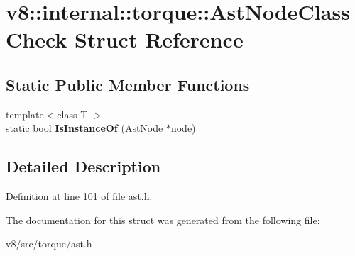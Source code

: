 \hypertarget{structv8_1_1internal_1_1torque_1_1AstNodeClassCheck}{}\section{v8\+:\+:internal\+:\+:torque\+:\+:Ast\+Node\+Class\+Check Struct Reference}
\label{structv8_1_1internal_1_1torque_1_1AstNodeClassCheck}
\subsection*{Static Public Member Functions}
\begin{DoxyCompactItemize}
\item 
\mbox{\label{structv8_1_1internal_1_1torque_1_1AstNodeClassCheck_ad8f597c5018d0b0e1db8a564d66c8731}} 
{\footnotesize template$<$class T $>$ }\\static \mbox{\hyperlink{classbool}{bool}} {\bfseries Is\+Instance\+Of} (\mbox{\hyperlink{structv8_1_1internal_1_1torque_1_1AstNode}{Ast\+Node}} $\ast$node)
\end{DoxyCompactItemize}


\subsection{Detailed Description}


Definition at line 101 of file ast.\+h.



The documentation for this struct was generated from the following file\+:\begin{DoxyCompactItemize}
\item 
v8/src/torque/ast.\+h\end{DoxyCompactItemize}

